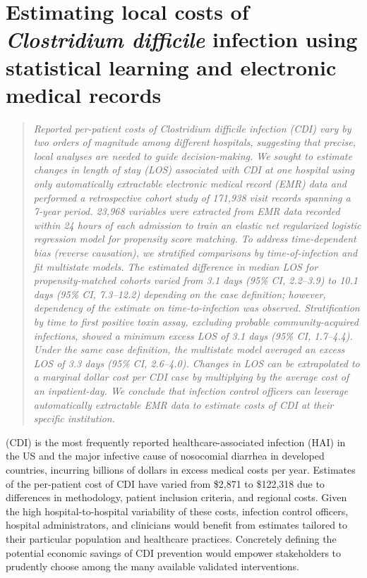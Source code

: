 
\chapter{Estimating local costs of \emph{Clostridium difficile} infection using statistical learning and electronic medical records}
\label{chap:cdi_cost}

\begin{quote}
\emph{Reported per-patient costs of \emph{Clostridium difficile} infection (CDI) vary by two orders of magnitude among different hospitals, suggesting that precise, local analyses are needed to guide decision-making. We sought to estimate changes in length of stay (LOS) associated with CDI at one hospital using only automatically extractable electronic medical record (EMR) data and performed a retrospective cohort study of 171,938 visit records spanning a 7-year period. 23,968 variables were extracted from EMR data recorded within 24 hours of each admission to train an elastic net regularized logistic regression model for propensity score matching. To address time-dependent bias (reverse causation), we stratified comparisons by time-of-infection and fit multistate models. The estimated difference in median LOS for propensity-matched cohorts varied from 3.1 days (95\% CI, 2.2–3.9) to 10.1 days (95\% CI, 7.3–12.2) depending on the case definition; however, dependency of the estimate on time-to-infection was observed. Stratification by time to first positive toxin assay, excluding probable community-acquired infections, showed a minimum excess LOS of 3.1 days (95\% CI, 1.7–4.4). Under the same case definition, the multistate model averaged an excess LOS of 3.3 days (95\% CI, 2.6–4.0). Changes in LOS can be extrapolated to a marginal dollar cost per CDI case by multiplying by the average cost of an inpatient-day. We conclude that infection control officers can leverage automatically extractable EMR data to estimate costs of CDI at their specific institution.
}
\end{quote}

 (CDI) is the most frequently reported healthcare-associated infection (HAI) in the US and the major infective cause of nosocomial diarrhea in developed countries, incurring billions of dollars in excess medical costs per year.\autocite{Zimlichman2013} Estimates of the per-patient cost of CDI have varied from \$2,871 to \$122,318 due to differences in methodology, patient inclusion criteria, and regional costs.\autocite{Gabriel2014,Ghantoji2010,Zhang2016} Given the high hospital-to-hospital variability of these costs,\autocite{Lofgren2014,Stevens2015} infection control officers, hospital administrators, and clinicians would benefit from estimates tailored to their particular population and healthcare practices. Concretely defining the potential economic savings of CDI prevention would empower stakeholders to prudently choose among the many available validated interventions.\autocite{Dubberke2014a,Katz2013}

